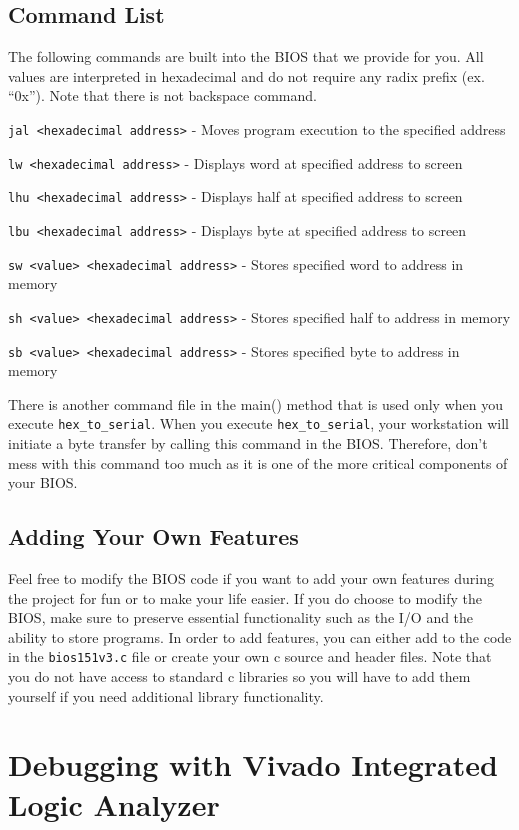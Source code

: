 \documentclass[11pt]{article}
\begin{document}
\subsection{Command List}
The following commands are built into the BIOS that we provide for you. All values are
interpreted in hexadecimal and do not require any radix prefix (ex. ``0x''). Note that there is not
backspace command.

\verb|jal <hexadecimal address>| - Moves program execution to the specified address

\verb|lw <hexadecimal address>| - Displays word at specified address to screen

\verb|lhu <hexadecimal address>| - Displays half at specified address to screen

\verb|lbu <hexadecimal address>| - Displays byte at specified address to screen

\verb|sw <value> <hexadecimal address>| - Stores specified word to address in memory

\verb|sh <value> <hexadecimal address>| - Stores specified half to address in memory

\verb|sb <value> <hexadecimal address>| - Stores specified byte to address in memory

There is another command file in the main() method that is used only when you execute
\verb|hex_to_serial|. When you execute \verb|hex_to_serial|, your workstation will initiate a byte
transfer by calling this command in the BIOS. Therefore, don’t mess with this command too
much as it is one of the more critical components of your BIOS.

\subsection{Adding Your Own Features}
Feel free to modify the BIOS code if you want to add your own features during the project for
fun or to make your life easier. If you do choose to modify the BIOS, make sure to preserve
essential functionality such as the I/O and the ability to store programs. In order to add
features, you can either add to the code in the \verb|bios151v3.c| file or create your own c source and
header files. Note that you do not have access to standard c libraries so you will have to add
them yourself if you need additional library functionality.

\section{Debugging with Vivado Integrated Logic Analyzer}
\label{sec:vivado_ila}
\end{document}
